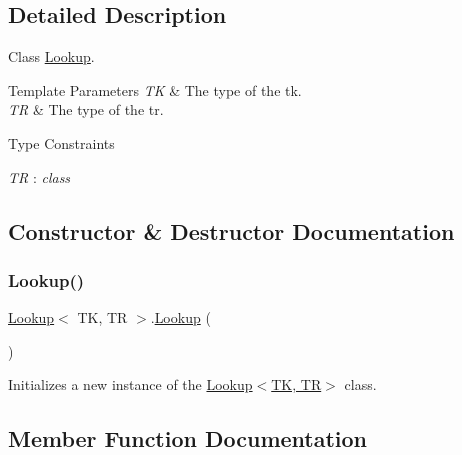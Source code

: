 \subsection{Detailed Description}
Class \hyperlink{class_lookup}{Lookup}. 


\begin{DoxyTemplParams}{Template Parameters}
{\em TK} & The type of the tk.\\
\hline
{\em TR} & The type of the tr.\\
\hline
\end{DoxyTemplParams}
\begin{Desc}
\item[Type Constraints]\begin{description}
\item[{\em TR} : {\em class}]\end{description}
\end{Desc}


\subsection{Constructor \& Destructor Documentation}
\mbox{\label{class_lookup_a9594e3583ab132612b367784ea39c0ee}} 
\subsubsection{\texorpdfstring{Lookup()}{Lookup()}}
{\footnotesize\ttfamily \hyperlink{class_lookup}{Lookup}$<$ TK, TR $>$.\hyperlink{class_lookup}{Lookup} (\begin{DoxyParamCaption}{ }\end{DoxyParamCaption})\hspace{0.3cm}{\ttfamily [inline]}}



Initializes a new instance of the \hyperlink{class_lookup_a9594e3583ab132612b367784ea39c0ee}{Lookup$<$\+T\+K, T\+R$>$} class. 



\subsection{Member Function Documentation}
\mbox{\label{class_lookup_a6dacd9aa4eb48983ebdce15553bc16ca}} 
